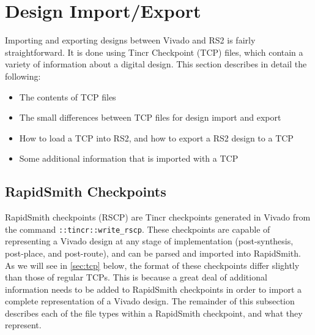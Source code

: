 \newpage
\section{Design Import/Export} \label{sec:import}
Importing and exporting designs between Vivado and RS2 is fairly
straightforward. It is done using Tincr Checkpoint (TCP) files, which contain a
variety of information about a digital design. This section describes in detail
the following: 

\begin{itemize}
  \item The contents of TCP files
  \item The small differences between TCP files for design import and export
  \item How to load a TCP into RS2, and how to export a RS2 design to a TCP
  \item Some additional information that is imported with a TCP 
\end{itemize}

\subsection{RapidSmith Checkpoints}
RapidSmith checkpoints (RSCP) are Tincr checkpoints generated in Vivado from the
command \texttt{::tincr::write\-\_rscp}. These checkpoints are capable of
representing a Vivado design at any stage of implementation (post-synthesis,
post-place, and post-route), and can be parsed and imported into RapidSmith. As
we will see in \autoref{sec:tcp} below, the format of these checkpoints differ
slightly than those of regular TCPs. This is because a great deal of additional
information needs to be added to RapidSmith checkpoints in order to import a
complete representation of a Vivado design. The remainder of this subsection
describes each of the file types within a RapidSmith checkpoint, and what they
represent.

